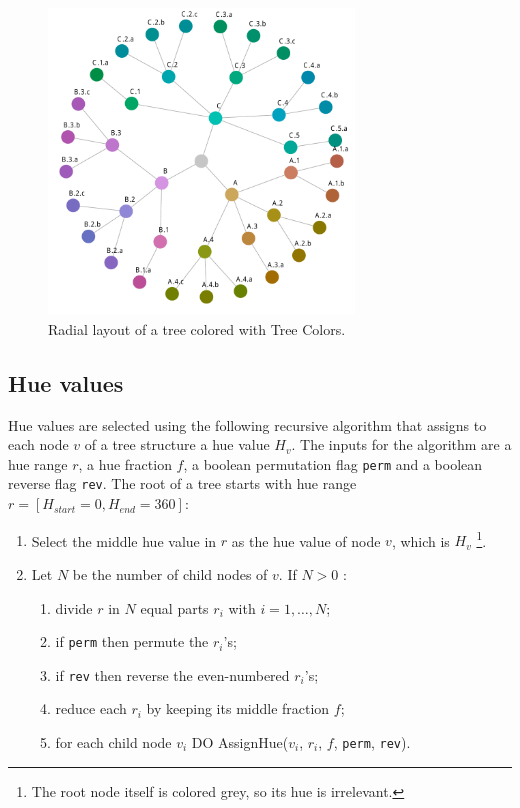 \documentclass[journal]{vgtc}                %
\begin{document}
\begin{figure}[tb]

  \centering
  \includegraphics[width=3.2in]{HCPgraph.pdf}
  \caption{Radial layout of a tree colored with Tree Colors.}\label{fig:graph}

\end{figure}

\subsection{Hue values}
Hue values are selected using the following recursive algorithm that assigns to each node 
$v$ of a tree structure a hue value $H_{v}$. 
The inputs for the algorithm are a hue range $r$, a hue fraction $f$, a boolean permutation flag  
\texttt{perm} and a boolean reverse flag \texttt{rev}.
The root of a tree starts with hue range $r=[H_{start}=0, H_{end}=360]$:

%
\begin{enumerate} \itemsep1pt \parskip0pt 
\item Select the middle hue value in $r$ as the hue value of node $v$, which is $H_v$ \footnote{The root node itself is colored grey, so its hue is irrelevant.}.
\item Let $N$ be the number of child nodes of $v$. If $N>0$ :
\begin{enumerate}[i] \itemsep1pt \parskip0pt 
\item divide $r$ in $N$ equal parts $r_i$ with $i=1,\ldots,N$;
\item if \texttt{perm} then permute the $r_i$'s;
\item if \texttt{rev} then reverse the even-numbered $r_i$'s;
\item reduce each $r_i$ by keeping its middle fraction $f$;
\item for each child node $v_i$ DO AssignHue($v_i$, $r_i$, $f$, \texttt{perm}, \texttt{rev}).
\end{enumerate}
\end{enumerate}
\end{document}
